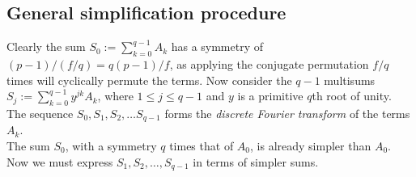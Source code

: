 \documentclass{article}
\begin{document}
\subsection{General simplification procedure}
	Clearly the sum $ S_0 := \sum_{k = 0}^{q - 1} A_k $ has a symmetry of $ (p - 1)/(f/q) = q(p - 1)/f $, as applying the conjugate permutation $ f/q $ times will cyclically permute the terms. Now consider the $ q - 1 $ multisums $ S_j := \sum_{k = 0}^{q - 1} y^{jk} A_k $, where $ 1 \le j \le q - 1 $ and $ y $ is a primitive $ q $th root of unity. The sequence $ S_0, S_1, S_2, \dots S_{q - 1} $ forms the \textit{discrete Fourier transform} of the terms $ A_k $.\\
    The sum $ S_0 $, with a symmetry $ q $ times that of $ A_0 $, is already simpler than $ A_0 $. Now we must express $ S_1, S_2, \dots, S_{q - 1} $ in terms of simpler sums.\\
\end{document}
